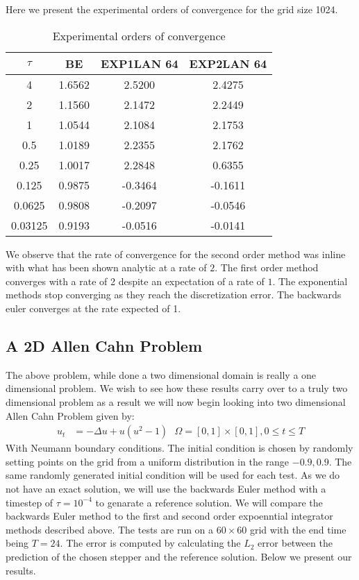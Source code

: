 Here we present the experimental orders of convergence for the grid size 1024.

\begin{table}[H]
    \centering
    \begin{tabular}{| c | c | c | c |}
    \hline
    $\tau$ & BE & EXP1LAN 64 & EXP2LAN 64 \\
    \hline
    4 & 1.6562 & 2.5200 & 2.4275 \\
    2 & 1.1560 & 2.1472 & 2.2449 \\
    1 & 1.0544 & 2.1084 & 2.1753 \\
    0.5 & 1.0189 & 2.2355 & 2.1762 \\
    0.25 & 1.0017 & 2.2848 & 0.6355 \\
    0.125 & 0.9875 & -0.3464 & -0.1611 \\
    0.0625 & 0.9808 & -0.2097 & -0.0546 \\
    0.03125 & 0.9193 & -0.0516 & -0.0141 \\
    \hline
    \end{tabular}
    \caption{Experimental orders of convergence}
    \label{tab:EOCs}
\end{table}


We observe that the rate of convergence for the second order method was inline with what has been shown analytic\cite{Huang2022} at a rate of $2$.
The first order method converges with a rate of 2 despite an expectation of a rate of $1$\cite{Huang2022}.
The exponential methods stop converging as they reach the discretization error.
The backwards euler converges at the rate expected of 1.

\subsection{A 2D Allen Cahn Problem}
The above problem, while done a two dimensional domain is really a one dimensional problem.
We wish to see how these results carry over to a truly two dimensional problem as a result we will now begin looking into two dimensional Allen Cahn Problem given by:
\begin{align*}
    u_t &= -\Delta u + u (u^2-1) \text{ } \Omega=[0,1]\times[0,1], 0\leq t \leq T
\end{align*}
With Neumann boundary conditions.
The initial condition is chosen by randomly setting points on the grid from a uniform distribution in the range $-0.9,0.9$.
The same randomly generated initial condition will be used for each test.
As we do not have an exact solution, we will use the backwards Euler method with a timestep of $\tau = 10^{-4}$ to genarate a reference solution.
We will compare the backwards Euler method to the first and second order expoenntial integrator methods described above.
The tests are run on a $60\times60$ grid with the end time being $T=24$.
The error is computed by calculating the $L_2$ error between the prediction of the chosen stepper and the reference solution. 
Below we present our results.

